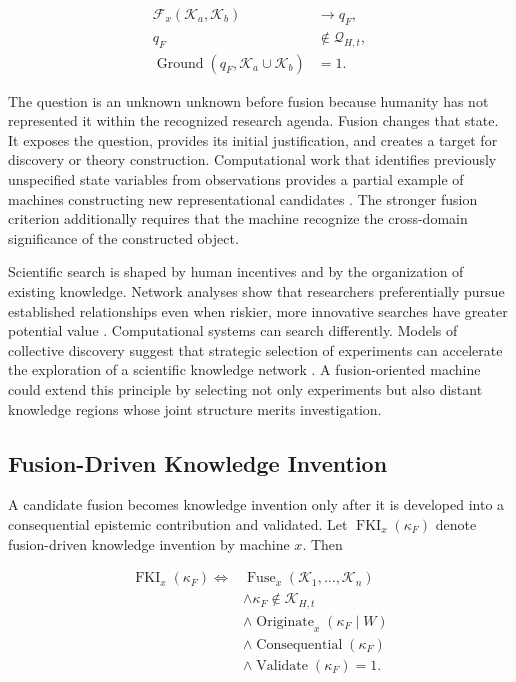 \begin{equation}
\begin{aligned}
\mathcal{F}_{x}(\mathcal{K}_{a},\mathcal{K}_{b})
&\longrightarrow q_F,\\
q_F
&\notin \mathcal{Q}_{H,t},\\
\operatorname{Ground}(q_F,
\mathcal{K}_{a}\cup\mathcal{K}_{b})
&=1.
\end{aligned}
\label{eq:fusion_unknown_unknown}
\end{equation}

The question is an unknown unknown before fusion because humanity has not
represented it within the recognized research agenda. Fusion changes that
state. It exposes the question, provides its initial justification, and creates
a target for discovery or theory construction. Computational work that
identifies previously unspecified state variables from observations provides a
partial example of machines constructing new representational candidates
\cite{chen2022variables}. The stronger fusion criterion additionally requires
that the machine recognize the cross-domain significance of the constructed
object.

Scientific search is shaped by human incentives and by the organization of
existing knowledge. Network analyses show that researchers preferentially
pursue established relationships even when riskier, more innovative searches
have greater potential value \cite{foster2015tradition}. Computational systems
can search differently. Models of collective discovery suggest that strategic
selection of experiments can accelerate the exploration of a scientific
knowledge network \cite{rzhetsky2015experiments}. A fusion-oriented machine
could extend this principle by selecting not only experiments but also distant
knowledge regions whose joint structure merits investigation.

\subsection{\textbf{Fusion-Driven Knowledge Invention}}

A candidate fusion becomes knowledge invention only after it is developed into
a consequential epistemic contribution and validated. Let
$\operatorname{FKI}_{x}(\kappa_F)$ denote fusion-driven knowledge invention by
machine $x$. Then

\begin{equation}
\begin{aligned}
\operatorname{FKI}_{x}(\kappa_F)
\Longleftrightarrow{}&
\operatorname{Fuse}_{x}
(\mathcal{K}_{1},\ldots,\mathcal{K}_{n})\\
&\land \kappa_F\notin\mathcal{K}_{H,t}\\
&\land
\operatorname{Originate}_{x}(\kappa_F\mid W)\\
&\land \operatorname{Consequential}(\kappa_F)\\
&\land \operatorname{Validate}(\kappa_F)=1.
\end{aligned}
\label{eq:fusion_knowledge_invention}
\end{equation}

